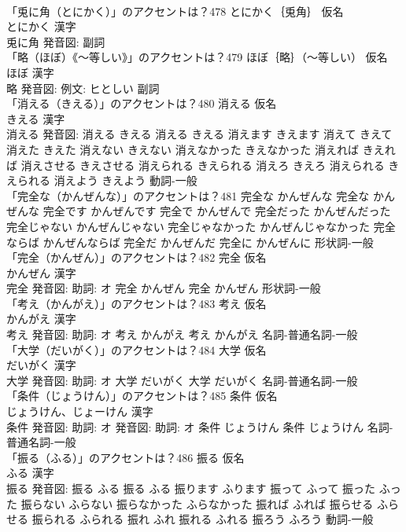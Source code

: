 \documentclass[8pt]{extreport}
\begin{document}
\begin{CJK}{UTF8}{min}
\\	「兎に角（とにかく）」のアクセントは？478	とにかく｛兎角｝ 仮名　
\\	とにかく 漢字　
\\	兎に角 発音図:							副詞 
\\	「略（ほぼ）《〜等しい》」のアクセントは？479	ほぼ｛略｝（〜等しい） 仮名　
\\	ほぼ 漢字　
\\	略 発音図: 例文: ヒとしい							副詞 
\\	「消える（きえる）」のアクセントは？480	消える 仮名　
\\	きえる 漢字　
\\	消える 発音図:	消える きえる		消える きえる 消えます きえます 消えて きえて 消えた きえた 消えない きえない 消えなかった きえなかった 消えれば きえれば 消えさせる きえさせる 消えられる きえられる 消えろ きえろ 消えられる きえられる 消えよう きえよう				動詞-一般 
\\	「完全な（かんぜんな）」のアクセントは？481		完全な かんぜんな		完全な かんぜんな 完全です かんぜんです 完全で かんぜんで 完全だった かんぜんだった 完全じゃない かんぜんじゃない 完全じゃなかった かんぜんじゃなかった 完全ならば かんぜんならば 完全だ かんぜんだ 完全に かんぜんに				形状詞-一般 
\\	「完全（かんぜん）」のアクセントは？482	完全 仮名　
\\	かんぜん 漢字　
\\	完全 発音図: 助詞: オ	完全 かんぜん		完全 かんぜん				形状詞-一般 
\\	「考え（かんがえ）」のアクセントは？483	考え 仮名　
\\	かんがえ 漢字　
\\	考え 発音図: 助詞: オ	考え かんがえ		考え かんがえ				名詞-普通名詞-一般 
\\	「大学（だいがく）」のアクセントは？484	大学 仮名　
\\	だいがく 漢字　
\\	大学 発音図: 助詞: オ	大学 だいがく		大学 だいがく				名詞-普通名詞-一般 
\\	「条件（じょうけん）」のアクセントは？485	条件 仮名　
\\	じょうけん、じょーけん 漢字　
\\	条件 発音図: 助詞: オ 発音図: 助詞: オ	条件 じょうけん		条件 じょうけん				名詞-普通名詞-一般 
\\	「振る（ふる）」のアクセントは？486	振る 仮名　
\\	ふる 漢字　
\\	振る 発音図:	振る ふる		振る ふる 振ります ふります 振って ふって 振った ふった 振らない ふらない 振らなかった ふらなかった 振れば ふれば 振らせる ふらせる 振られる ふられる 振れ ふれ 振れる ふれる 振ろう ふろう				動詞-一般 

\end{CJK}
\end{document}
